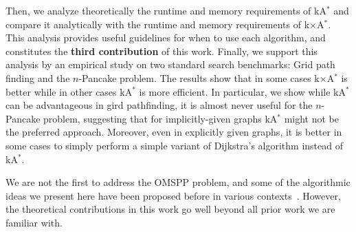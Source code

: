 \documentclass[smallextended]{svjour3}       %
\newcommand{\omspp}{\ac{OMSPP}\xspace}
\newcommand{\kastar}{kA$^*$\xspace}
\newcommand{\kxastar}{k$\times$A$^*$\xspace}
\newcommand{\roni}[1]{\textbf{[RS:#1]}}
\begin{document}
Then, we analyze theoretically the runtime and memory requirements of \kastar and compare it analytically with the runtime and memory requirements of \kxastar.
This analysis provides useful guidelines for when to use each algorithm, and constitutes the \textbf{third contribution} of this work. 
Finally, we support this analysis by an empirical study on two standard search benchmarks: Grid path finding and the $n$-Pancake problem. 
The results show that in some cases \kxastar is better while in other cases \kastar is more efficient. In particular, we show while \kastar can be advantageous in gird pathfinding, it is almost never useful for the $n$-Pancake problem, suggesting that for implicitly-given graphs \kastar might not be the preferred approach. 
Moreover, even in explicitly given graphs, it is better in some cases to simply perform a simple variant of Dijkstra's algorithm instead of \kastar. %





We are not the first to address the \omspp problem, and some of the algorithmic ideas we present here have been proposed before in various contexts~\cite{zhao2018fast,abeywickrama2016k,delling2011phast,delling2011faster}. However, the theoretical contributions in this work go well beyond all prior work we are familiar with. 
\end{document}
